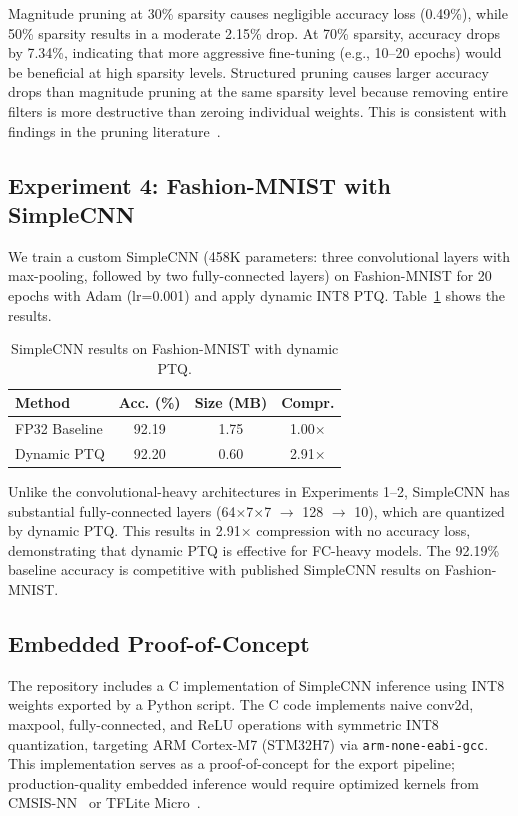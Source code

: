 \documentclass[10pt,twocolumn]{article}
\begin{document}
Magnitude pruning at 30\% sparsity causes negligible accuracy loss (0.49\%), while 50\% sparsity results in a moderate 2.15\% drop.
At 70\% sparsity, accuracy drops by 7.34\%, indicating that more aggressive fine-tuning (e.g., 10--20 epochs) would be beneficial at high sparsity levels.
Structured pruning causes larger accuracy drops than magnitude pruning at the same sparsity level because removing entire filters is more destructive than zeroing individual weights.
This is consistent with findings in the pruning literature~\cite{structured-pruning, lottery-ticket}.

\subsection{Experiment 4: Fashion-MNIST with SimpleCNN}

We train a custom SimpleCNN (458K parameters: three convolutional layers with max-pooling, followed by two fully-connected layers) on Fashion-MNIST for 20 epochs with Adam (lr=0.001) and apply dynamic INT8 PTQ.
Table~\ref{tab:fmnist} shows the results.

\begin{table}[t]
\caption{SimpleCNN results on Fashion-MNIST with dynamic PTQ.}
\label{tab:fmnist}
\centering
\begin{tabular}{lccc}
\toprule
\textbf{Method} & \textbf{Acc. (\%)} & \textbf{Size (MB)} & \textbf{Compr.} \\
\midrule
FP32 Baseline & 92.19 & 1.75 & 1.00$\times$ \\
Dynamic PTQ & 92.20 & 0.60 & 2.91$\times$ \\
\bottomrule
\end{tabular}
\end{table}

Unlike the convolutional-heavy architectures in Experiments 1--2, SimpleCNN has substantial fully-connected layers (64$\times$7$\times$7 $\to$ 128 $\to$ 10), which are quantized by dynamic PTQ.
This results in 2.91$\times$ compression with no accuracy loss, demonstrating that dynamic PTQ is effective for FC-heavy models.
The 92.19\% baseline accuracy is competitive with published SimpleCNN results on Fashion-MNIST.

\subsection{Embedded Proof-of-Concept}

The repository includes a C implementation of SimpleCNN inference using INT8 weights exported by a Python script.
The C code implements naive conv2d, maxpool, fully-connected, and ReLU operations with symmetric INT8 quantization, targeting ARM Cortex-M7 (STM32H7) via \texttt{arm-none-eabi-gcc}.
This implementation serves as a proof-of-concept for the export pipeline; production-quality embedded inference would require optimized kernels from CMSIS-NN~\cite{cmsis-nn} or TFLite Micro~\cite{tflitemicro}.
\end{document}
